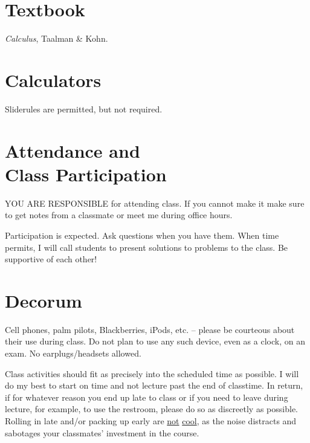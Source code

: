 \documentclass[margin,line,pifont,palatino,courier]{res}
\newenvironment{list2}{
  \begin{list}{$\bullet$}{%
      \setlength{\itemsep}{0in}
      \setlength{\parsep}{0in} \setlength{\parskip}{0in}
      \setlength{\topsep}{0in} \setlength{\partopsep}{0in}
      \setlength{\leftmargin}{0.2in}}}{\end{list}}
\begin{document}
\begin{resume}
\vspace{0.25pc}
\section{\sc Textbook}  \emph{Calculus}, Taalman \& Kohn.

\section{\sc Calculators} Sliderules are permitted, but not required.  %


\section{\sc Attendance and \\ Class Participation} YOU ARE RESPONSIBLE for attending class.  If you cannot make it make sure to get notes from a classmate or meet me during office hours. 

Participation is expected.  Ask questions when you have them.  When time permits, I will call students to present solutions to problems to the class.  Be supportive of each other!    

\section{\sc Decorum} Cell phones, palm pilots, Blackberries, iPods, etc. -- please be courteous about their use during class.  Do not plan to use any such device, even as a clock, on an exam. No earplugs/headsets allowed.

Class activities should fit as precisely into the scheduled time as possible.   I will do my best to start on time and not lecture past the end of classtime.  In return, if for whatever reason you end up late to class or if you need to leave during lecture, for example, to use the restroom, please do so as discreetly as possible.  Rolling in late and/or packing up early are \underline{not} \underline{cool}, as the noise distracts and sabotages your classmates' investment in the course. 


\end{resume}
\end{document}
